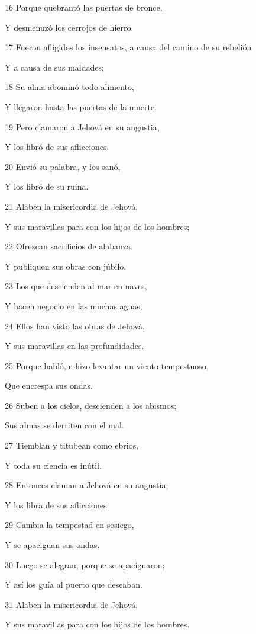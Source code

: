 \par 16 Porque quebrantó las puertas de bronce,
\par Y desmenuzó los cerrojos de hierro.
\par 17 Fueron afligidos los insensatos, a causa del camino de su rebelión
\par Y a causa de sus maldades;
\par 18 Su alma abominó todo alimento,
\par Y llegaron hasta las puertas de la muerte.
\par 19 Pero clamaron a Jehová en su angustia,
\par Y los libró de sus aflicciones.
\par 20 Envió su palabra, y los sanó,
\par Y los libró de su ruina.
\par 21 Alaben la misericordia de Jehová,
\par Y sus maravillas para con los hijos de los hombres;
\par 22 Ofrezcan sacrificios de alabanza,
\par Y publiquen sus obras con júbilo.
\par 23 Los que descienden al mar en naves,
\par Y hacen negocio en las muchas aguas,
\par 24 Ellos han visto las obras de Jehová,
\par Y sus maravillas en las profundidades.
\par 25 Porque habló, e hizo levantar un viento tempestuoso,
\par Que encrespa sus ondas.
\par 26 Suben a los cielos, descienden a los abismos;
\par Sus almas se derriten con el mal.
\par 27 Tiemblan y titubean como ebrios,
\par Y toda su ciencia es inútil.
\par 28 Entonces claman a Jehová en su angustia,
\par Y los libra de sus aflicciones.
\par 29 Cambia la tempestad en sosiego,
\par Y se apaciguan sus ondas.
\par 30 Luego se alegran, porque se apaciguaron;
\par Y así los guía al puerto que deseaban.
\par 31 Alaben la misericordia de Jehová,
\par Y sus maravillas para con los hijos de los hombres.
